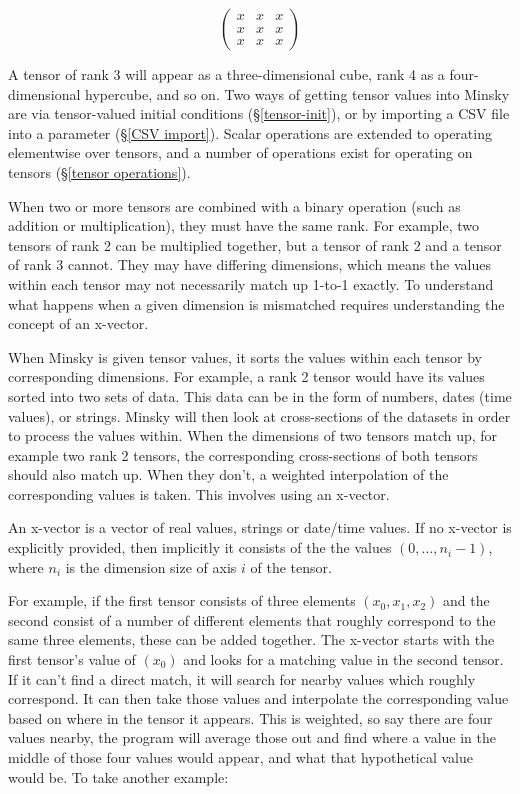 \begin{displaymath}
  \left(
    \begin{array}{ccc}
      x& x& x\\
      x& x& x\\
      x& x& x
    \end{array}
  \right)
\end{displaymath}

A tensor of rank 3 will appear as a three-dimensional cube, rank 4 as
a four-dimensional hypercube, and so on. Two ways of getting tensor
values into Minsky are via tensor-valued initial conditions
(\S\ref{tensor-init}), or by importing a CSV file into a parameter
(\S\ref{CSV import}). Scalar operations are extended to operating
elementwise over tensors, and a number of operations exist for
operating on tensors (\S\ref{tensor operations}).

When two or more tensors are combined with a binary operation (such as
addition or multiplication), they must have the same rank. For
example, two tensors of rank 2 can be multiplied together, but a
tensor of rank 2 and a tensor of rank 3 cannot. They may have
differing dimensions, which means the values within each tensor may
not necessarily match up 1-to-1 exactly.  To understand what happens
when a given dimension is mismatched requires understanding the
concept of an x-vector\label{x-vector}.

When Minsky is given tensor values, it sorts the values within each
tensor by corresponding dimensions. For example, a rank 2 tensor would
have its values sorted into two sets of data. This data can be in the
form of numbers, dates (time values), or strings. Minsky will then
look at cross-sections of the datasets in order to process the values
within. When the dimensions of two tensors match up, for example two
rank 2 tensors, the corresponding cross-sections of both tensors
should also match up. When they don't, a weighted interpolation of the
corresponding values is taken. This involves using an x-vector.

An x-vector is a vector of real values, strings or date/time values.
If no x-vector is explicitly provided, then implicitly it consists of
the the values $(0,\ldots,n_i-1)$, where $n_i$ is the dimension size
of axis $i$ of the tensor.

For example, if the first tensor consists of three elements
$(x_0, x_1, x_2)$ and the second consist of a number of different
elements that roughly correspond to the same three elements, these can
be added together.  The x-vector starts with the first tensor's value
of $(x_0)$ and looks for a matching value in the second tensor. If it
can't find a direct match, it will search for nearby values which
roughly correspond. It can then take those values and interpolate the
corresponding value based on where in the tensor it appears. This is
weighted, so say there are four values nearby, the program will
average those out and find where a value in the middle of those four
values would appear, and what that hypothetical value would be. To
take another example:

